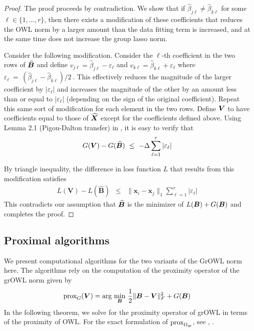 \begin{proof}
The proof proceeds by contradiction.  We show that if $\widehat \beta_{j \ell} \neq \widehat \beta_{k \ell}$ for some $\ell \in \{1,\dots, r\}$, then there exists a modification of these  coefficients that reduces the OWL norm by a larger amount than the data fitting term is increased, and at the same time does not increase the group lasso norm. 

Consider the following modification.  Consider the $\ell$-th coefficient in the two rows of $\widehat {\boldsymbol{B}}$ and define
$v_{j\ell} = \widehat \beta_{j \ell}-\varepsilon_\ell$ and $v_{k\ell} = \widehat \beta_{k\ell}+\varepsilon_\ell$ where $\varepsilon_\ell \ = \ (\widehat \beta_{j \ell}- \widehat \beta_{k \ell})/2 \ . $ This effectively reduces the magnitude of the larger coefficient by $|\varepsilon_\ell|$ and increases the magnitude of the other by an amount less than or equal to $|\varepsilon_\ell|$ (depending on the sign of the original coefficient).
Repeat this same sort of modification for each element in the two rows.
Define $\boldsymbol{V}$ to have coefficients equal to those of $\widehat {\boldsymbol{X}}$ except for the coefficients defined above. Using Lemma 2.1 (Pigou-Dalton transfer) in \cite{owl}, it is easy to verify that $$G(\bV) - G(\widehat\bB)  \ \leq \ -\Delta \sum_{\ell=1}^r |\varepsilon_\ell| $$

By triangle inequality, the difference in loss function $L$ that results from this modification satisfies
\begin{eqnarray*}
L(\bm V) - L(\widehat{\bm B})  & \leq  & \bigl\|{\bm x}_i - {\bm x}_j\bigr\|_1 \sum_{\ell=1}^r |\varepsilon_\ell|  \label{delta_L3}
\end{eqnarray*}
This contradicts our assumption that $\widehat{\boldsymbol{B}}$ is the minimizer of $L(\boldsymbol{B}) + G(\boldsymbol{B})$ and completes the proof.

\end{proof}
\fi 

\subsection{Proximal algorithms}
We present computational algorithms for the two variants of the GrOWL norm here. The algorithms rely on the computation of the proximity operator \cite{prox} of the grOWL norm given by
\begin{eqnarray}\label{proxG}
\textnormal{prox}_{G}(\bV) = \textnormal{arg} \underset{\bB}{ \textnormal{ min } } \frac{1}{2}\|\bB - \bV\|_F^2 + G(\bB) 
\end{eqnarray}
In the following theorem, we solve for the proximity operator of grOWL in terms of the proximity of OWL. For the exact formulation of $\textnormal{prox}_{\Omega_{\boldsymbol{w}}}$, see \cite{candes13}, \cite{ZengFigueiredo2014}.

